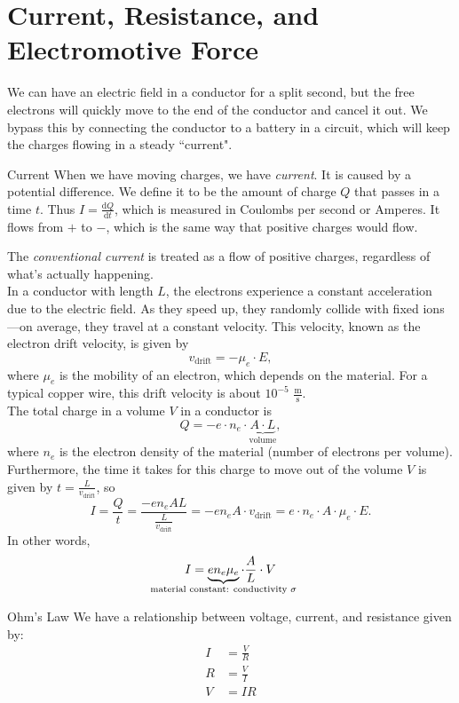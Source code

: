 \documentclass[class=article, crop=false]{standalone}
\begin{document}
  \section{Current, Resistance, and Electromotive Force}
  We can have an electric field in a conductor for a split second, but the free electrons will quickly move to the end of the conductor and cancel it out. We bypass this by connecting the conductor to a battery in a circuit, which will keep the charges flowing in a steady ``current".
  \begin{definition}{Current}
    When we have moving charges, we have \emph{current}. It is caused by a potential difference. We define it to be the amount of charge $Q$ that passes in a time $t$. Thus $I = \frac{\mathrm{d}Q}{\mathrm{d}t}$, which is measured in Coulombs per second or Amperes. It flows from $+$ to $-$, which is the same way that positive charges would flow.
  \end{definition}
  The \emph{conventional current} is treated as a flow of positive charges, regardless of what's actually happening. \\[10pt]
  In a conductor with length $L$, the electrons experience a constant acceleration due to the electric field. As they speed up, they randomly collide with fixed ions---on average, they travel at a constant velocity. This velocity, known as the electron drift velocity, is given by 
  \[
    v_{\text{drift}} = -\mu_e\cdot E,
  \]
  where $\mu_e$ is the mobility of an electron, which depends on the material. For a typical copper wire, this drift velocity is about $10^{-5}$ $\frac{\text{m}}{\text{s}}$. \\[10pt]
  The total charge in a volume $V$ in a conductor is
  \[
    Q = -e \cdot n_e\cdot \underbrace{A\cdot L}_{\text{volume}},
  \]
  where $n_e$ is the electron density of the material (number of electrons per volume). Furthermore, the time it takes for this charge to move out of the volume $V$ is given by $t = \frac{L}{v_{\text{drift}}}$, so
  \[
    I = \frac{Q}{t} = \frac{-en_eAL}{\frac{L}{v_{\text{drift}}}} = -en_eA\cdot v_{\text{drift}} = e\cdot n_e\cdot A\cdot \mu_e\cdot E.
  \]
  In other words,
  \[
    I = \underbrace{en_e\mu_e}_{\mathclap{\text{material constant: conductivity $\sigma$}}}\cdot \frac{A}{L}\cdot V
  \]
  \begin{theorem}{Ohm's Law}
    We have a relationship between voltage, current, and resistance given by:
    \begin{align*}
      I &= \frac{V}{R} \\
      R &= \frac{V}{I} \\
      V &= IR
    \end{align*}
  \end{theorem}
\end{document}
